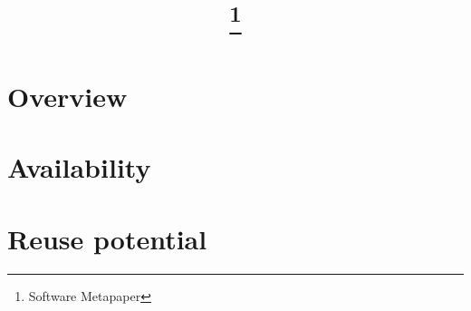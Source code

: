 \documentclass{article}
\begin{document}
\title{\mytitle\thanks{Software Metapaper}}
\author{\myauthor}
\date{\small \myaffiliation}
\maketitle
    \begin{abstract}
      
    \end{abstract}



\section{Overview}


\section{Availability}


\section{Reuse potential}


\printbibliography
\end{document}
